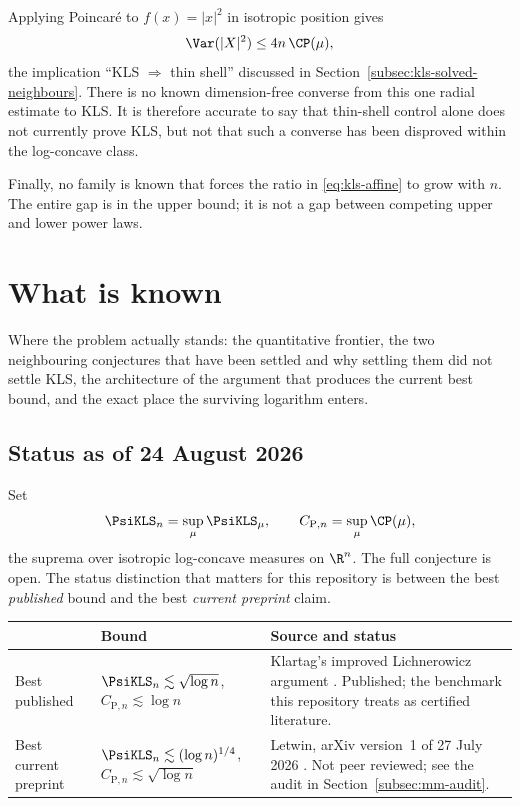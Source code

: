 \documentclass[../../main.tex]{subfiles}
\begin{document}
Applying Poincar\'e to $f(x)=|x|^2$ in isotropic position gives
\begin{equation}
  \Var(|X|^2)\le4n\,\CP(\mu),
  \label{eq:kls-implies-thin-shell}
\end{equation}
the implication ``KLS $\Rightarrow$ thin shell'' discussed in
Section~\ref{subsec:kls-solved-neighbours}. There is no known dimension-free converse from this
one radial estimate to KLS. It is therefore accurate to say that thin-shell control alone does
not currently prove KLS, but not that such a converse has been disproved within the log-concave
class.

Finally, no family is known that forces the ratio in \eqref{eq:kls-affine} to grow with $n$. The
entire gap is in the upper bound; it is not a gap between competing upper and lower power laws.

\section{What is known}
\label{sec:kls-known}

Where the problem actually stands: the quantitative frontier, the two neighbouring conjectures
that have been settled and why settling them did not settle KLS, the architecture of the argument
that produces the current best bound, and the exact place the surviving logarithm enters.

\subsection{Status as of 24 August 2026}
\label{subsec:kls-status}

Set
\[
  \PsiKLS_n=\sup_\mu\PsiKLS_\mu,
  \qquad
  C_{\mathrm P,n}=\sup_\mu\CP(\mu),
\]
the suprema over isotropic log-concave measures on $\R^n$. The full conjecture is open. The
status distinction that matters for this repository is between the best \emph{published} bound
and the best \emph{current preprint} claim.

\begin{center}
\begin{tabularx}{\textwidth}{@{}>{\raggedright\arraybackslash}p{}>{\raggedright\arraybackslash}p{}Y@{}}
\toprule
& Bound & Source and status \\
\midrule
Best published & $\PsiKLS_n\lesssim\sqrt{\log n}$, \quad $C_{\mathrm P,n}\lesssim\log n$
& Klartag's improved Lichnerowicz argument \cite{Klartag2023Logarithmic}. Published; the
benchmark this repository treats as certified literature. \\
\addlinespace
Best current preprint & $\PsiKLS_n\lesssim(\log n)^{1/4}$, \quad $C_{\mathrm P,n}\lesssim\sqrt{\log n}$
& Letwin, arXiv version~1 of 27 July 2026 \cite{Letwin2026QuadraticKLS}. Not peer reviewed; see
the audit in Section~\ref{subsec:mm-audit}. \\
\bottomrule
\end{tabularx}
\end{center}
\end{document}
